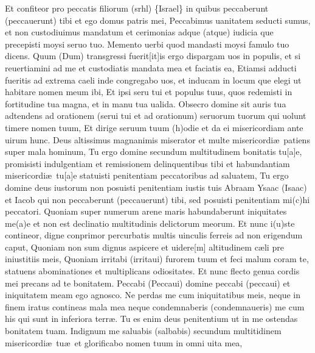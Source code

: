 \documentclass[letter,12pt]{book}
\newcommand*\zallmancaps{\usefont{U}{Zallman}{xl}{n}}
\begin{document}
{\color{Red} E}t confiteor pro peccatis filiorum (srhl) \{Israel\} in quibus peccaberunt (peccauerunt) tibi et ego domus patris mei,
{\color{Red} P}eccabimus uanitatem seducti sumus, et non custodiuimus mandatum et cerimonias adque (atque) iudicia que precepisti moysi seruo tuo.
{\color{Red} M}emento uerbi quod mandasti moysi famulo tuo dicens.
{\color{Red} Q}uum (Dum) transgressi fuerit[it]is ergo dispargam uos in populis, et si reuertiamini ad me et custodiatis mandata mea et faciatis ea,
{\color{Red} E}tiamsi adducti fueritis ad extrema caeli inde congregabo uos, et inducam in locum que elegi ut habitare nomen meum ibi,
{\color{Red} E}t ipsi seru tui et populus tuus, quos redemisti in fortitudine tua magna, et in manu tua ualida.
{\color{Red} O}bsecro domine sit auris tua adtendens
ad orationem (serui tui et ad orationum) seruorum tuorum qui uolunt timere nomen tuum,
{\color{Red} E}t dirige seruum tuum (h)odie et da ei misericordiam ante uirum hunc.
\lettrine[lines=3]{\color{Red} \zallmancaps D}{}eus altissimus magnanimis miserator et multe misericordi\ae \ patiens super mala hominum,
{\color{Red} T}u ergo domine secundum multitudinem bonitatis tu[a]e, promisisti indulgentiam et remissionem delinquentibus tibi et habundantiam misericordi\ae \ tu[a]e statuisti penitentiam peccatoribus ad saluatem,
{\color{Red} T}u ergo domine deus iustorum non posuisti penitentiam iustis tuis Abraam Ysaac (Isaac) et Iacob qui non peccaberunt (peccauerunt) tibi, sed posuisti penitentiam mi(c)hi peccatori.
{\color{Red} Q}uoniam super numerum arene maris habundaberunt iniquitates me(a)e et non est declinatio multitudinis delictorum meorum.
{\color{Red} E}t nunc i(u)ste contineor, digne conprimor percurbatis multis uinculis ferreis ad non erigendum caput,
{\color{Red} Q}uoniam non sum dignus aspicere et uidere[m] altitudinem c\ae li pre iniustitiis meis,
{\color{Red} Q}uoniam irritabi (irritaui) furorem tuum et feci malum coram te,
statuens abominationes et multiplicans odiositates.
{\color{Red} E}t nunc flecto genua cordis mei precans ad te bonitatem.
{\color{Red} P}eccabi (Peccaui) domine peccabi (peccaui) et iniquitatem meam ego agnosco.
{\color{Red} N}e perdas me cum iniquitatibus meis, neque in finem iratus contineas mala mea neque condemnaberis (condemnaueris) me cum his qui sunt in inferiora terr\ae .
{\color{Red} T}u es enim deus penitentium ut in me ostendas bonitatem tuam.
{\color{Red} I}ndignum me saluabis (salbabis) secundum multitidinem misericordi\ae \ tu\ae \ et glorificabo nomen tuum in omni uita mea,
\end{document}
